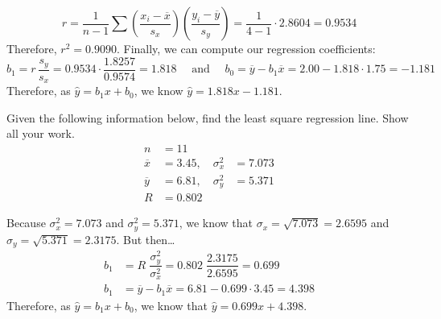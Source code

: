 \documentclass[11pt,letterpaper]{article}
\begin{document}
	\[
	r= \dfrac{1}{n - 1} \sum \left( \dfrac{x_i - \overline{x}}{s_x} \right) \left( \dfrac{y_i - \overline{y}}{s_y} \right)= \dfrac{1}{4 - 1} \cdot 2.8604= 0.9534
	\]
Therefore, $r^2= 0.9090$. Finally, we can compute our regression coefficients:
	\[
	b_1= r\, \dfrac{s_y}{s_x}= 0.9534 \cdot \dfrac{1.8257}{0.9574}= 1.818 \quad \text{ and } \quad b_0= \overline{y} - b_1 \overline{x}= 2.00 - 1.818 \cdot 1.75= -1.181
	\]
Therefore, as $\widehat{y}= b_1x + b_0$, we know $\widehat{y}= 1.818x - 1.181$. 





\newpage





 Given the following information below, find the least square regression line. Show all your work. 
	\[
	\begin{aligned}
	n&= 11 \\
	\overline{x}&= 3.45, \quad \sigma_x^2&= 7.073 \\
	\overline{y}&= 6.81, \quad \sigma_y^2&= 5.371 \\
	R&= 0.802
	\end{aligned}
	\] \pspace

\sol Because $\sigma_x^2= 7.073$ and $\sigma_y^2= 5.371$, we know that $\sigma_x= \sqrt{7.073}= 2.6595$ and $\sigma_y= \sqrt{5.371}= 2.3175$. But then\dots
	\[
	\begin{aligned}
	b_1&= R\;\dfrac{\sigma_y^2}{\sigma_x^2}= 0.802\; \dfrac{2.3175}{2.6595}= 0.699 \\[0.3cm]
	b_1&= \overline{y} - b_1 \overline{x}= 6.81 - 0.699 \cdot 3.45= 4.398
	\end{aligned}
	\] \pvspace{0.3cm}
Therefore, as $\widehat{y}= b_1x + b_0$, we know that $\widehat{y}= 0.699x + 4.398$. 





\newpage
\end{document}
